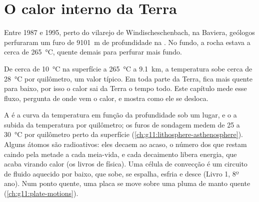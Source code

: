 \chapter{O calor interno da Terra}\label{ch:g12:internal-heat}

Entre 1987 e 1995, perto do vilarejo de Windischeschenbach, na Baviera,
geólogos perfuraram um furo de \qty{9101}{m} de profundidade na . No fundo, a rocha estava a cerca de \qty{265}{\celsius}, quente
demais para perfurar mais fundo.

De cerca de \qty{10}{\celsius} na superfície a \qty{265}{\celsius} a
\qty{9.1}{km}, a temperatura sobe cerca de \qty{28}{\celsius} por
quilômetro, um valor típico. Em toda parte da Terra, fica mais quente para
baixo, por isso o calor sai da Terra o tempo todo. Este capítulo mede esse
fluxo, pergunta de onde vem o calor, e mostra como ele se desloca.

\begin{recall}
A  é a curva da temperatura em função da profundidade sob um lugar,
e o  a subida da temperatura por quilômetro; os furos de
sondagem medem de 25 a \qty{30}{\celsius} por quilômetro perto da superfície
(\cref{ch:g11:lithosphere-asthenosphere}). Alguns átomos são radioativos:
eles decaem ao acaso, o número dos que restam caindo pela metade a cada
meia-vida, e cada decaimento libera energia, que acaba virando calor (os
livros de física). Uma célula de convecção é um circuito de fluido aquecido
por baixo, que sobe, se espalha, esfria e desce (Livro 1, 8º ano). Num ponto
quente, uma placa se move sobre uma pluma de manto quente
(\cref{ch:g11:plate-motions}).
\end{recall}

